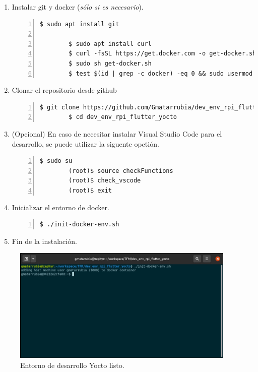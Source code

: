 \begin{enumerate}
    \item Instalar git y docker (\emph{sólo si es necesario}).
    \begin{lstlisting}[style=consola, numbers=left]
        $ sudo apt install git

        $ sudo apt install curl
        $ curl -fsSL https://get.docker.com -o get-docker.sh
        $ sudo sh get-docker.sh
        $ test $(id | grep -c docker) -eq 0 && sudo usermod -aG docker $(whoami)
    \end{lstlisting}

    \item Clonar el repositorio desde github
    \begin{lstlisting}[style=consola, numbers=left]
        $ git clone https://github.com/Gmatarrubia/dev_env_rpi_flutter_yocto.git
        $ cd dev_env_rpi_flutter_yocto
    \end{lstlisting}

    \item (Opcional) En caso de necesitar instalar Visual Studio Code para el desarrollo,
    se puede utilizar la siguente opctión.
    \begin{lstlisting}[style=consola, numbers=left]
        $ sudo su
        (root)$ source checkFunctions
        (root)$ check_vscode
        (root)$ exit
    \end{lstlisting}

    \item Inicializar el entorno de docker.
    \begin{lstlisting}[style=consola, numbers=left]
        $ ./init-docker-env.sh
    \end{lstlisting}

    \item Fin de la instalación.
\end{enumerate}

\begin{figure}[H]
    \centering
    \includegraphics[width=0.95\textwidth]{imgs/yocto-docker-ready}
    \caption[yocto docker ready]{Entorno de desarrollo Yocto listo.}
    \label{imgs:yocto-docker-ready}
\end{figure}

